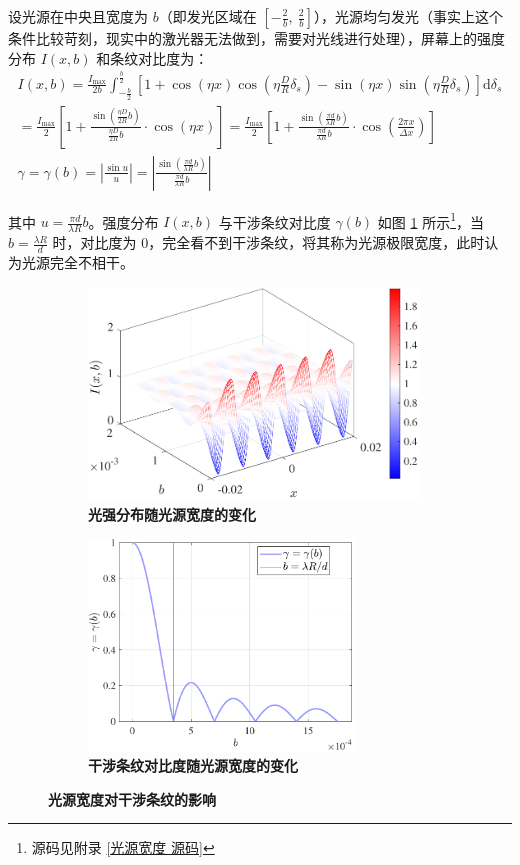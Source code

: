 \documentclass[UTF8]{report}
\theoremstyle{MyLineTheoremStyle} %
\theoremstyle{MyBlockTheoremStyle} %
\theoremstyle{MySubsubsectionStyle} %
\begin{document}
设光源在中央且宽度为 $b$（即发光区域在 $[-\frac{2}{b},\ \frac{2}{b}]$），光源均匀发光（事实上这个条件比较苛刻，现实中的激光器无法做到，需要对光线进行处理），屏幕上的强度分布 $I(x, b)$ 和条纹对比度为：
\begin{gather}
I(x, b) = \frac{I_{\text{max}}}{2b} \int_{-\frac{b}{2}}^{\frac{b}{2}} \left[ 1 + \cos \left( \eta x \right)\cos \left( \eta\frac{D}{R}\delta_s \right) - \sin \left( \eta x \right)\sin \left( \eta\frac{D}{R}\delta_s \right) \right] \mathrm{d} \delta_s \\ 
= \frac{I_{\text{max}}}{2} \left[ 1 + \frac{\sin \left( \frac{\eta D}{2 R} b \right)}{\frac{\eta D}{2 R} b}\cdot \cos \left( \eta x \right) \right] = \frac{I_{\text{max}}}{2} \left[ 1 + \frac{\sin \left( \frac{\pi d}{\lambda R} b \right)}{\frac{\pi d}{\lambda R} b}\cdot \cos \left( \frac{2 \pi x}{\Delta x}  \right) \right] \\ 
\gamma = \gamma(b) = \left| \frac{\sin u}{u} \right| = \left| \frac{\sin \left( \frac{\pi d}{\lambda R} b \right)}{\frac{\pi d}{\lambda R} b} \right|
\end{gather}

其中 $u = \frac{\pi d}{\lambda R} b$。强度分布 $I(x, b)$ 与干涉条纹对比度 $\gamma(b)$ 如图 \ref{光源宽度} 所示\footnote{源码见附录 \ref{光源宽度 源码}}，当 $b = \frac{\lambda R}{d}$ 时，对比度为 0，完全看不到干涉条纹，将其称为光源极限宽度，此时认为光源完全不相干。

\begin{figure}[H]\centering
\begin{subfigure}[t]{0.5\columnwidth}\centering
    \includegraphics[height=160pt]{assets/3/光强分布.pdf}
    \caption{\bfseries 光强分布随光源宽度的变化 }
\end{subfigure}\hfill
\begin{subfigure}[t]{0.5\columnwidth}\centering
    \includegraphics[height=160pt]{assets/3/干涉条纹对比度.pdf}
    \caption{\bfseries 干涉条纹对比度随光源宽度的变化 }
\end{subfigure}
\caption{\bfseries 光源宽度对干涉条纹的影响 }\label{光源宽度}
\end{figure}
\end{document}
